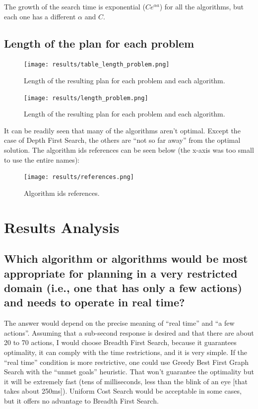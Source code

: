 \documentclass[a4paper,12pt]{article}
\begin{document}
The growth of the search time is exponential ($C e^{\alpha a}$) for all the algorithms, but each one has a different $\alpha$ and $C$.

\newpage
\subsection{Length of the plan for each problem}
\begin{figure}[!h]
\centering
\texttt{[image: results/table\_length\_problem.png]}
\caption{Length of the resulting plan for each problem and each algorithm.}
\label{fig_raw_data}
\end{figure}

\begin{figure}[!h]
\centering
\texttt{[image: results/length\_problem.png]}
\caption{Length of the resulting plan for each problem and each algorithm.}
\label{fig_raw_data}
\end{figure}

It can be readily seen that many of the algorithms aren't optimal. Except the case of Depth First Search, the others are ``not so far away'' from the optimal solution. The algorithm ids references can be seen below (the x-axis was too small to use the entire names):
\begin{figure}[!h]
\centering
\texttt{[image: results/references.png]}
\caption{Algorithm ids references.}
\label{fig_raw_data}
\end{figure}


\newpage
\section{Results Analysis}
\subsection{Which algorithm or algorithms would be most appropriate for planning in a very restricted domain (i.e., one that has only a few actions) and needs to operate in real time?}
The answer would depend on the precise meaning of ``real time'' and ``a few actions''. Assuming that a sub-second response is desired and that there are about 20 to 70 actions, I would choose Breadth First Search, because it guarantees optimality, it can comply with the time restrictions, and it is very simple. If the ``real time'' condition is more restrictive, one could use Greedy Best First Graph Search with the ``unmet goals'' heuristic. That won't guarantee the optimality but it will be extremely fast (tens of milliseconds, less than the blink of an eye [that takes about 250ms]). Uniform Cost Search would be acceptable in some cases, but it offers no advantage to Breadth First Search.
\end{document}
